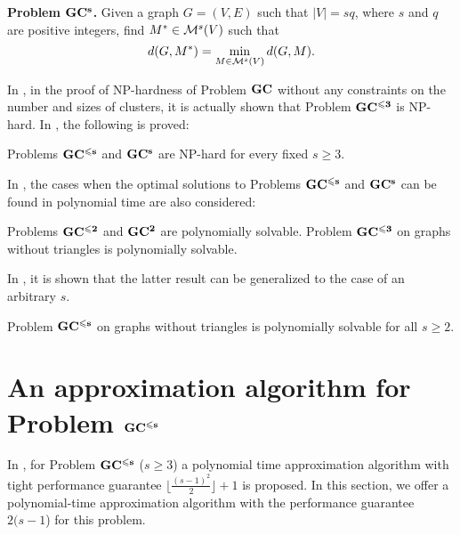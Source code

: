 \documentclass[runningheads]{llncs}
\begin{document}
{\bf Problem $\bf GC^s$.} Given a graph $G = (V,E)$ such that $|V|
= sq$, where $s$ and $q$ are positive integers, find $M^* \in
{\cal M}^{s}(V)$ such that
$$
   d(G,M^*)=\min\limits_{M \in {\cal M}^{s}(V)} d(G,M).
$$

In \cite{bbc04}, in the proof of NP-hardness of Problem $\bf GC$ without
any constraints on the number and sizes of clusters, it is
actually shown that Problem ${\bf GC^{\leqslant 3}}$ is NP-hard. 
In \cite{in11}, the following is proved:

\begin{theorem} {\rm \cite{in11}} \label{t1} 
Problems $\bf GC^{\leqslant s}$ and 
$\bf GC^{s}$ are NP-hard for every fixed ${s \geqslant 3}$.
\end{theorem}

In \cite{in11}, the cases when the optimal solutions to Problems 
$\bf GC^{\leqslant s}$ and $\bf GC^s$ can be found in polynomial time 
are also considered:

\begin{theorem} {\rm \cite{in11}} \label{t2} 
Problems ${\bf GC^{\leqslant 2}}$ and ${\bf GC^2}$ are polynomially solvable.
Problem ${\bf GC^{\leqslant 3}}$ on graphs without triangles is
polynomially solvable.
\end{theorem}

In \cite{iin16}, it is shown that the latter result can be generalized 
to the case of an arbitrary $s$. 

\begin{theorem} {\rm  \cite{iin16}} \label{t3} 
Problem ${\bf GC^{\leqslant s}}$ on graphs without triangles is
polynomially solvable for all $s \geqslant 2$.
\end{theorem}

\medskip

\section{An approximation algorithm for Problem ${\bf GC^{\leqslant s}}$}

In \cite{iin16}, for Problem $\bf GC^{\leqslant s}$ ($s \geqslant 3$) a
polynomial time approximation algorithm with tight performance
guarantee $\lfloor\frac{(s-1)^2}{2}\rfloor+1$ is proposed. 
In this section, we offer a polynomial-time approximation algorithm 
with the performance guarantee $2(s-1$) for this problem.
\end{document}
